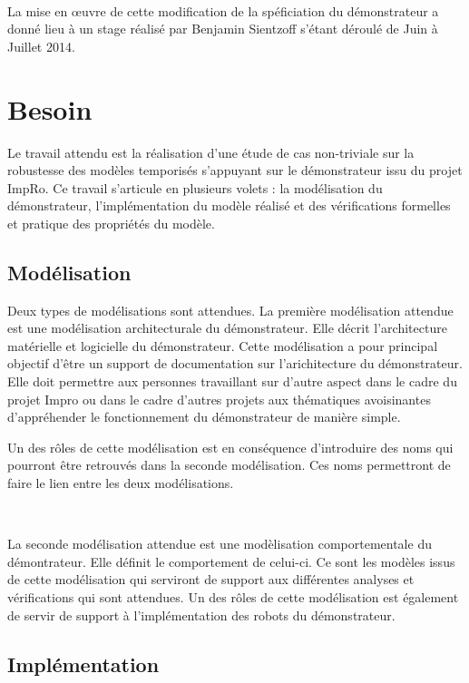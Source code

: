         ~
        
        La mise en \oe uvre de cette modification de la spéficiation du
        démonstrateur a donné lieu à un stage réalisé par Benjamin Sientzoff
        s'étant déroulé de Juin à Juillet 2014.

  \section{Besoin}

    Le travail attendu est la réalisation d'une étude de cas non-triviale sur
    la robustesse des modèles temporisés s'appuyant sur le démonstrateur issu
    du projet ImpRo. Ce travail s'articule en plusieurs volets : la
    modélisation du démonstrateur, l'implémentation du modèle réalisé et des
    vérifications formelles et pratique des propriétés du modèle.

    \subsection{Modélisation}

      Deux types de modélisations sont attendues. La première modélisation
      attendue est une modélisation architecturale du démonstrateur. Elle décrit
      l'architecture matérielle et logicielle du démonstrateur. Cette
      modélisation a pour principal objectif d'être un support de
      documentation sur l'arichitecture du démonstrateur. Elle doit permettre
      aux personnes travaillant sur d'autre aspect dans le cadre du projet
      Impro ou dans le cadre d'autres projets aux thématiques avoisinantes
      d'appréhender le fonctionnement du démonstrateur de manière simple.

      Un des rôles de cette modélisation est en conséquence d'introduire des
      noms qui pourront être retrouvés dans la seconde modélisation. Ces noms
      permettront de faire le lien entre les deux modélisations.

      ~
  
      La seconde modélisation attendue est une modèlisation comportementale du
      démontrateur. Elle définit le comportement de celui-ci. Ce sont les
      modèles issus de cette modélisation qui serviront de support aux
      différentes analyses et vérifications qui sont attendues. Un des rôles
      de cette modélisation est également de servir de support à
      l'implémentation des robots du démonstrateur.

    \subsection{Implémentation}

